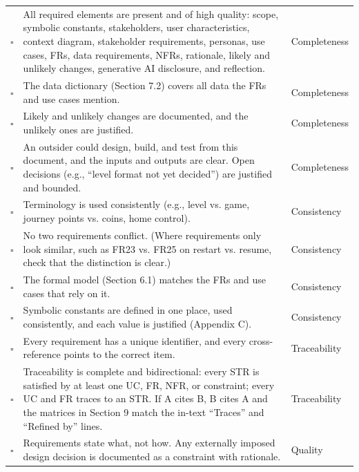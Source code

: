 \documentclass[10pt,titlepage]{article}
\newcommand{\chk}{$\square$}
\begin{document}
\begin{longtable}{@{}>{\raggedright\arraybackslash}p{} >{\raggedright\arraybackslash}p{} >{\raggedright\arraybackslash}p{}@{}}
\chk & All required elements are present and of high quality: scope, symbolic constants, stakeholders,
user characteristics, context diagram, stakeholder requirements, personas, use cases, 
FRs, data requirements, NFRs, rationale,
likely and unlikely changes, generative AI disclosure, and reflection.
& Completeness \\

\chk & The data dictionary (Section 7.2) covers all data the FRs and use cases mention.
& Completeness \\

\chk & Likely and unlikely changes are documented, and the unlikely ones are justified.
& Completeness \\

\chk & An outsider could design, build, and test from this document, and the inputs and outputs 
are clear. Open decisions (e.g., “level format not yet decided”) are justified and bounded.
& Completeness \\

\chk & Terminology is used consistently (e.g., level vs. game, journey points vs. coins, home control).
& Consistency \\

\chk & No two requirements conflict. (Where requirements only look similar, such as FR23 vs. FR25 
on restart vs. resume, check that the distinction is clear.)
& Consistency \\

\chk & The formal model (Section 6.1) matches the FRs and use cases that rely on it.
& Consistency \\

\chk & Symbolic constants are defined in one place, used consistently, and each value is 
justified (Appendix C).
& Consistency \\

\chk & Every requirement has a unique identifier, and every cross-reference points to the correct item.
& Traceability \\

\chk & Traceability is complete and bidirectional: every STR is satisfied by at least one UC, FR, NFR, 
or constraint; every UC and FR traces to an STR. If A cites B, B cites A and the matrices in 
Section 9 match the in-text “Traces” and “Refined by” lines.
& Traceability \\

\chk & Requirements state what, not how. Any externally imposed design decision is documented as a 
constraint with rationale.
& Quality \\


\end{longtable}
\end{document}
